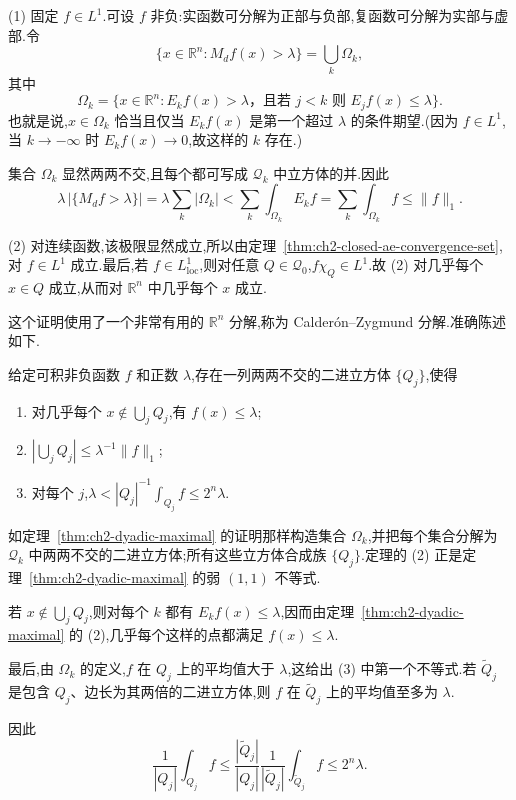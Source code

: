\begin{Proof}
(1) 固定 $f\in L^1$.可设 $f$ 非负:实函数可分解为正部与负部,复函数可分解为实部与虚部.令
\[
 \{x\in\mathbb R^n:M_df(x)>\lambda\}=\bigcup_k\Omega_k,
\]
其中
\[
 \Omega_k=\{x\in\mathbb R^n:E_kf(x)>\lambda\text{，且若 }j<k\text{ 则 }E_jf(x)\le\lambda\}.
\]
也就是说,$x\in\Omega_k$ 恰当且仅当 $E_kf(x)$ 是第一个超过 $\lambda$ 的条件期望.(因为 $f\in L^1$,当 $k\to-\infty$ 时 $E_kf(x)\to0$,故这样的 $k$ 存在.)

\hypertarget{sample-page-046}{}
集合 $\Omega_k$ 显然两两不交,且每个都可写成 $\mathcal Q_k$ 中立方体的并.因此
\[
 \lambda\,|\{M_df>\lambda\}|
 =\lambda\sum_k|\Omega_k|
 <\sum_k\int_{\Omega_k}E_kf
 =\sum_k\int_{\Omega_k}f\le\|f\|_1.
\]

(2) 对连续函数,该极限显然成立,所以由定理~\ref{thm:ch2-closed-ae-convergence-set},对 $f\in L^1$ 成立.最后,若 $f\in L^1_{\mathrm{loc}}$,则对任意 $Q\in\mathcal Q_0$,$f\chi_Q\in L^1$.故 (2) 对几乎每个 $x\in Q$ 成立,从而对 $\mathbb R^n$ 中几乎每个 $x$ 成立.
\end{Proof}

这个证明使用了一个非常有用的 $\mathbb R^n$ 分解,称为 Calderón--Zygmund 分解.准确陈述如下.

\begin{Theorem}
\label{thm:ch2-calderon-zygmund-decomposition}
给定可积非负函数 $f$ 和正数 $\lambda$,存在一列两两不交的二进立方体 $\{Q_j\}$,使得
\begin{enumerate}[label=(\arabic*)]
\item 对几乎每个 $x\notin\bigcup_jQ_j$,有 $f(x)\le\lambda$;
\item $\left|\bigcup_jQ_j\right|\le\lambda^{-1}\|f\|_1$;
\item 对每个 $j$,$\lambda<|Q_j|^{-1}\int_{Q_j}f\le2^n\lambda$.
\end{enumerate}
\end{Theorem}

\begin{Proof}
如定理~\ref{thm:ch2-dyadic-maximal} 的证明那样构造集合 $\Omega_k$,并把每个集合分解为 $\mathcal Q_k$ 中两两不交的二进立方体;所有这些立方体合成族 $\{Q_j\}$.定理的 (2) 正是定理~\ref{thm:ch2-dyadic-maximal} 的弱 $(1,1)$ 不等式.

若 $x\notin\bigcup_jQ_j$,则对每个 $k$ 都有 $E_kf(x)\le\lambda$,因而由定理~\ref{thm:ch2-dyadic-maximal} 的 (2),几乎每个这样的点都满足 $f(x)\le\lambda$.

最后,由 $\Omega_k$ 的定义,$f$ 在 $Q_j$ 上的平均值大于 $\lambda$,这给出 (3) 中第一个不等式.若 $\widetilde Q_j$ 是包含 $Q_j$、边长为其两倍的二进立方体,则 $f$ 在 $\widetilde Q_j$ 上的平均值至多为 $\lambda$.

\hypertarget{sample-page-047}{}
因此
\[
 \frac1{|Q_j|}\int_{Q_j}f
 \le\frac{|\widetilde Q_j|}{|Q_j|}\frac1{|\widetilde Q_j|}\int_{\widetilde Q_j}f
 \le2^n\lambda.
\]
\end{Proof}


